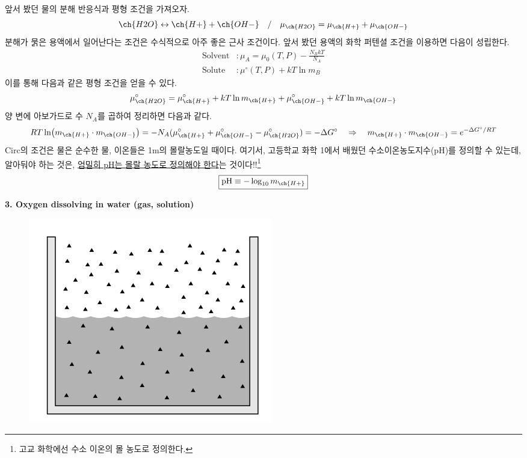 \documentclass{article}
\begin{document}
앞서 봤던 물의 분해 반응식과 평형 조건을 가져오자.
\begin{equation}
    \ch{H2 O} \leftrightarrow \ch{H+} + \ch{OH-} \quad / \quad \mu_{\ch{H2O}} = \mu_{\ch{H+}} + \mu_{\ch{OH-}}
\end{equation}
분해가 묽은 용액에서 일어난다는 조건은 수식적으로 아주 좋은 근사 조건이다. 앞서 봤던 용액의 화학 퍼텐셜 조건을 이용하면 다음이 성립한다.
\begin{align}
    \text{Solvent} &: \mu_A = \mu_0 (T,P) - \frac{N_B kT}{N_A}\\
    \text{Solute} &: \mu^\circ (T,P) + kT \ln m_B
\end{align}
이를 통해 다음과 같은 평형 조건을 얻을 수 있다.
\begin{equation}
    \mu_{\ch{H2 O}}^\circ = \mu_{\ch{H+}}^\circ + kT \ln m_{\ch{H+}} + \mu_{\ch{OH-}}^\circ + kT\ln m_{\ch{OH-}}
\end{equation}
양 변에 아보가드로 수 $N_A$를 곱하여 정리하면 다음과 같다.
\begin{equation}
    RT \ln (m_{\ch{H+}} \cdot m_{\ch{OH-}}) = -N_A (\mu_{\ch{H+}}^\circ + \mu_{\ch{OH-}}^\circ - \mu_{\ch{H2 O}}^\circ) = -\Delta G^\circ  \quad \Rightarrow \quad m_{\ch{H+}} \cdot m_{\ch{OH-}} = e^{-\Delta G^\circ / RT}
\end{equation}
Circ의 조건은 물은 순수한 물, 이온들은 1m의 몰랄농도일 때이다. 여기서, 고등학교 화학 1에서 배웠던 수소이온농도지수(pH)를 정의할 수 있는데,  알아둬야 하는 것은, \underline{엄밀히 pH는 몰랄 농도로 정의해야 한다}는 것이다!!\footnote{고교 화학에선 수소 이온의 몰 농도로 정의한다.}
\begin{equation}
    \boxed{\text{pH} \equiv -\log_{10} m_{\ch{H+}}}
\end{equation}

\newpage

\noindent
\textbf{3. Oxygen dissolving in water (gas, solution)}

\begin{figure}[h]
    \centering
    \includegraphics[width=0.3\linewidth]{images/fig6_3.png}
\end{figure}
\end{document}
